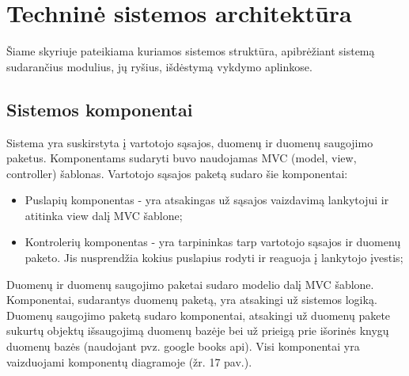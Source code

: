 \documentclass{VUMIFPSkursinis}
\begin{document}
\section{Techninė sistemos architektūra}
	Šiame skyriuje pateikiama kuriamos sistemos struktūra, apibrėžiant sistemą sudarančius modulius, jų ryšius, išdėstymą vykdymo aplinkose. 
	\subsection{Sistemos komponentai}
		Sistema yra suskirstyta į vartotojo sąsajos, duomenų ir duomenų saugojimo paketus.
		Komponentams sudaryti buvo naudojamas MVC (model, view, controller) šablonas.
		Vartotojo sąsajos paketą sudaro šie komponentai:
		\begin{itemize}
			\item Puslapių komponentas - yra atsakingas už sąsajos vaizdavimą lankytojui ir atitinka view dalį MVC šablone;
			\item Kontrolerių komponentas - yra tarpininkas tarp vartotojo sąsajos ir duomenų paketo.
				Jis nusprendžia kokius puslapius rodyti ir reaguoja į lankytojo įvestis; 
		\end{itemize}
		Duomenų ir duomenų saugojimo paketai sudaro modelio dalį MVC šablone.
		Komponentai, sudarantys duomenų paketą, yra atsakingi už sistemos logiką.
		Duomenų saugojimo paketą sudaro komponentai, atsakingi už duomenų pakete sukurtų objektų išsaugojimą duomenų bazėje
		bei už prieigą prie išorinės knygų duomenų bazės (naudojant pvz. google books api). 
		Visi komponentai yra vaizduojami komponentų diagramoje (žr. 17 pav.).	
\end{document}
